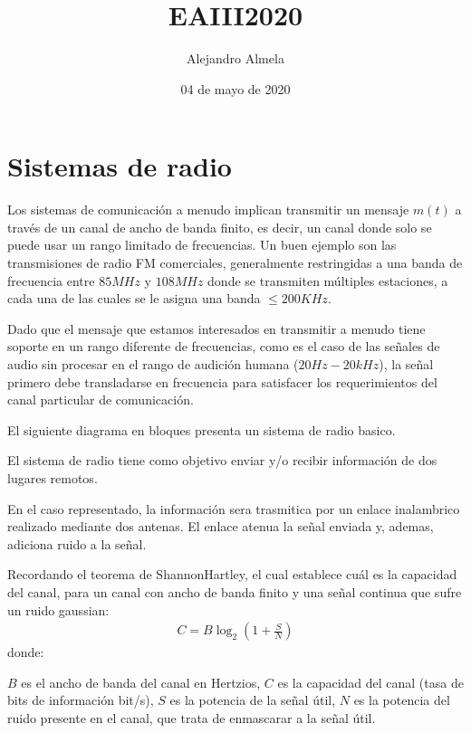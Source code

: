 \documentclass[letterpaper,10pt,spanish]{sphinxmanual}
\title{EAIII2020}
\date{04 de mayo de 2020}
\author{Alejandro Almela}
\let\sphinxpxdimen\pdfpxdimen\else\newdimen\sphinxpxdimen
\begin{document}
\pagestyle{empty}
\sphinxmaketitle
\pagestyle{plain}
\sphinxtableofcontents
\pagestyle{normal}
\label{\detokenize{index::doc}}



\chapter{Sistemas de radio}
\label{\detokenize{introduccion/sistemas:Sistemas-de-radio}}\label{\detokenize{introduccion/sistemas::doc}}
Los sistemas de comunicación a menudo implican transmitir un mensaje \(m(t)\) a través de un canal de ancho de banda finito, es decir, un canal donde solo se puede usar un rango limitado de frecuencias. Un buen ejemplo son las transmisiones de radio FM comerciales, generalmente restringidas a una banda de frecuencia entre \(85MHz\) y \(108MHz\) donde se transmiten múltiples estaciones, a cada una de las cuales se le asigna una banda \(\le 200 KHz\).

Dado que el mensaje que estamos interesados en transmitir a menudo tiene soporte en un rango diferente de frecuencias, como es el caso de las señales de audio sin procesar en el rango de audición humana (\(20 Hz - 20 kHz\)), la señal primero debe transladarse en frecuencia para satisfacer los requerimientos del canal particular de comunicación.

El siguiente diagrama en bloques presenta un sistema de radio basico.

\sphinxincludegraphics[width=731\sphinxpxdimen,height=276\sphinxpxdimen]{{radio1}.png}

El sistema de radio tiene como objetivo enviar y/o recibir información de dos lugares remotos.

En el caso representado, la información sera trasmitica por un enlace inalambrico realizado mediante dos antenas. El enlace atenua la señal enviada y, ademas, adiciona ruido a la señal.

Recordando el teorema de Shannon\sphinxhyphen{}Hartley, el cual establece cuál es la capacidad del canal, para un canal con ancho de banda finito y una señal continua que sufre un ruido gaussian:
\begin{equation*}
\begin{split}C=B\log _{2}\left(1+{\frac {S}{N}}\right)\end{split}
\end{equation*}
donde:

\(B\) es el ancho de banda del canal en Hertzios, \(C\) es la capacidad del canal (tasa de bits de información bit/s), \(S\) es la potencia de la señal útil, \(N\) es la potencia del ruido presente en el canal, que trata de enmascarar a la señal útil.
\end{document}
